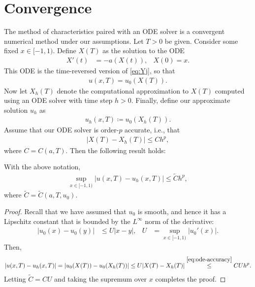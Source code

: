 \documentclass[11pt]{amsart}
\begin{document}
  \section{Convergence}
  The method of characteristics paired with an ODE solver is a convergent numerical method under our assumptions. Let $T >0$ be given. Consider some fixed $x \in [-1,1)$. Define $X(T)$ as the solution to the ODE
    \begin{align}\label{eq:X-ode2}
      X'(t) &= -a(X(t)), & X(0) = x.
    \end{align}
    This ODE is the time-reversed version of \eqref{eq:Yj}, so that 
    \begin{align*}
      u(x,T) = u_0(X(T)).
    \end{align*}
    Now let $X_h(T)$ denote the computational approximation to $X(T)$ computed using an ODE solver with time step $h > 0$. Finally, define our approximate solution $u_h$ as
    \begin{align*}
      u_h(x,T) \coloneqq u_0(X_h(T)).
    \end{align*}
    Assume that our ODE solver is order-$p$ accurate, i.e., that
    \begin{align}\label{eq:ode-accuracy}
      \left| X(T) - X_h(T) \right| \leq C h^p,
    \end{align}
    where $C = C(a,T)$. Then the following result holds:
  \begin{proposition}\label{prop:convergence}
    With the above notation,
    \begin{align}\label{eq:pde-accuracy}
      \sup_{x \in [-1,1)} \left| u(x,T) - u_h(x,T) \right| \leq \widetilde{C} h^p,
    \end{align}
    where $\widetilde{C} = \widetilde{C}(a, T, u_0)$.
  \end{proposition}
  \begin{proof}
    Recall that we have assumed that $u_0$ is smooth, and hence it has a Lipschitz constant that is bounded by the $L^\infty$ norm of the derivative:
    \begin{align*}
      \left| u_0(x) - u_0(y) \right| &\leq U |x - y|, & U &= \sup_{x \in [-1,1)} |u_0'(x)|.
    \end{align*}
    Then,
    \begin{align*}
      \left| u(x,T) - u_h(x,T) \right| = \left| u_0(X(T)) - u_0(X_h(T)) \right| \leq U | X(T) - X_h(T)| \stackrel{\eqref{eq:ode-accuracy}}{\leq} C U h^p.
    \end{align*}
    Letting $\widetilde{C} = C U$ and taking the supremum over $x$ completes the proof.
  \end{proof}
\end{document}
